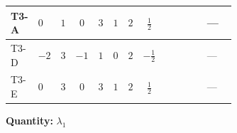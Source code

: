 \documentclass[8pt]{article}
\begin{document}
\begin{landscape}
\begin{longtable}{@{}llcccccc >{\raggedright\arraybackslash}p{0.21\linewidth} >{\raggedright\arraybackslash}p{0.21\linewidth} >{\raggedright\arraybackslash}p{0.21\linewidth}@{}}
\midrule
T3-A & $0$ & $1$ & $0$ & $3$ & $1$ & $2$ & $\frac{1}{2}$ & \scriptsize\adjustbox{max width=\linewidth}{$\begin{gathered} +12 {\lambda_1}^2\end{gathered}$} & \scriptsize\adjustbox{max width=\linewidth}{$\begin{gathered} +2 {\lambda_{HS_1}^{(1)}}^2\end{gathered}$} & --- \\
\midrule
T3-D & $-2$ & $3$ & $-1$ & $1$ & $0$ & $2$ & $-\frac{1}{2}$ & \scriptsize\adjustbox{max width=\linewidth}{$\begin{gathered} +12 {\lambda_1}^2\end{gathered}$} & \scriptsize\adjustbox{max width=\linewidth}{$\begin{gathered} +6 {\lambda_{HS_1}^{(1)}}^2\end{gathered}$} & --- \\
\midrule
T3-E & $0$ & $3$ & $0$ & $3$ & $1$ & $2$ & $\frac{1}{2}$ & \scriptsize\adjustbox{max width=\linewidth}{$\begin{gathered} +12 {\lambda_1}^2\end{gathered}$} & \scriptsize\adjustbox{max width=\linewidth}{$\begin{gathered} +6 {\lambda_{HS_1}^{(1)}}^2\end{gathered}$} & --- \\
\midrule
\bottomrule
\end{longtable}
\clearpage
\noindent\textbf{Quantity: }$\lambda_1$\par\smallskip

\end{landscape}
\end{document}
